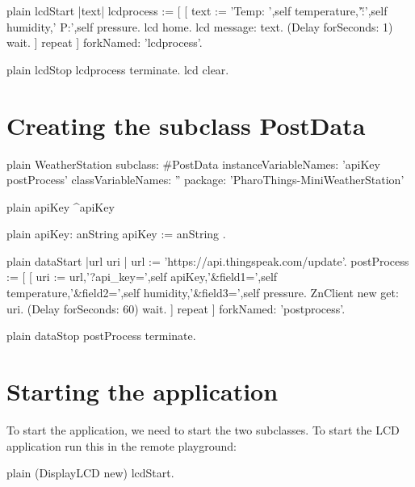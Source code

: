 \documentclass[10pt,twoside,english]{_support/latex/sbabook/sbabook}
\begin{document}
\begin{displaycode}{plain}
lcdStart
    |text|
    lcdprocess :=  [ [        
    text := 'Temp: ',self temperature,'\H:',self humidity,' P:',self pressure. 
    lcd home. 
    lcd message: text. 
    (Delay forSeconds: 1) wait. 
    ] repeat ] forkNamed: 'lcdprocess'. 
\end{displaycode}

\begin{displaycode}{plain}
lcdStop
    lcdprocess terminate. 
    lcd clear.
\end{displaycode}
\section{Creating the subclass PostData}
\begin{displaycode}{plain}
WeatherStation subclass: #PostData
	instanceVariableNames: 'apiKey postProcess'
	classVariableNames: ''
	package: 'PharoThings-MiniWeatherStation'
\end{displaycode}

\begin{displaycode}{plain}
apiKey
    ^apiKey
\end{displaycode}

\begin{displaycode}{plain}
apiKey: anString    
    apiKey := anString .
\end{displaycode}

\begin{displaycode}{plain}
dataStart
    |url uri |
    url := 'https://api.thingspeak.com/update'.
    postProcess :=  [ [        
        uri := url,'?api_key=',self apiKey,'&field1=',self temperature,'&field2=',self humidity,'&field3=',self pressure.
        ZnClient new get: uri.
    (Delay forSeconds: 60) wait. 
    ] repeat ] forkNamed: 'postprocess'. 
\end{displaycode}

\begin{displaycode}{plain}
dataStop
    postProcess terminate. 
\end{displaycode}
\section{Starting the application}
To start the application, we need to start the two subclasses. To start the LCD application run this in the remote playground:

\begin{displaycode}{plain}
(DisplayLCD new) lcdStart.
\end{displaycode}
\end{document}
